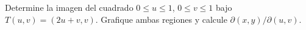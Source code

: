Determine la imagen del cuadrado $0\leq u\leq1$, $0\leq v\leq1$ bajo $T(u,v)=(2u+v,v)$. Grafique ambas regiones y calcule $\partial(x,y)/\partial(u,v)$.
